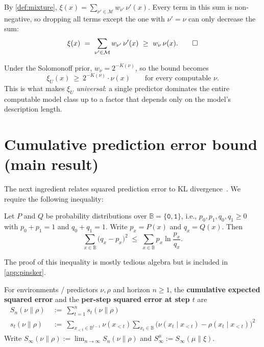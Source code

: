 \documentclass[fontsize=11pt, parskip=half]{scrartcl}
\newcommand{\Mc}{\mathcal{M}}
\newcommand{\Sn}[2]{S_{n}(#1 \parallel #2)}
\begin{document}
\begin{solution}
By \cref{def:mixture}, $\xi(x) = \sum_{\nu' \in \Mc} w_{\nu'} \,\nu'(x)$.
Every term in this sum is non-negative, so dropping all terms except the one with
$\nu' = \nu$ can only decrease the sum:
\[
  \xi(x) ~=~ \sum_{\nu' \in \Mc} w_{\nu'}\, \nu'(x)
  ~\geq~ w_\nu\, \nu(x). \qedhere
\]
\end{solution}

\begin{remark}
Under the Solomonoff prior, $w_\nu = 2^{-K(\nu)}$, so the bound becomes
\[
  \xi_U(x) ~\geq~ 2^{-K(\nu)} \cdot \nu(x) \qquad \text{for every computable }\nu.
\]
This is what makes $\xi_U$ \emph{universal}: a single predictor dominates the
entire computable model class up to a factor that depends only on the model's
description length.
\end{remark}

\section{Cumulative prediction error bound (main result)}\label{prob:bound}


The next ingredient relates squared prediction error to KL divergence~\cite[Lemma~11.6.1]{Cover:06}. 
We require the following inequality:

\begin{theorem}\label{thm:pinsker}
Let $P$ and $Q$ be probability distributions over $\mathbb{B} = \{\texttt{0}, \texttt{1}\}$, i.e., $p_0, p_1, q_0, q_1 \geq 0$
with $p_0 + p_1 = 1$ and $q_0 + q_1 = 1$. Write $p_x = P(x)$ and $q_x = Q(x)$. Then
\[
    \sum_{x \in \mathbb{B}} \big( q_x - p_x \big)^2 \;\leq\; \sum_{x \in \mathbb{B}} p_x \ln \frac{p_x}{q_x}.
    \tag{$\star$}
\]

\end{theorem}
The proof of this inequality is mostly tedious algebra but is included in \cref{app:pinsker}. 


\begin{definition}\label{def:S_infty}
For environments / predictors $\nu, \rho$ and horizon $n \geq 1$, the \textbf{cumulative expected squared error} and the \textbf{per-step squared error at step $t$} are
\begin{align*}
\Sn{\nu}{\rho} ~&:=~ \sum_{t=1}^n s_t(\nu \parallel \rho) \\
s_t(\nu \parallel \rho) ~&:=~ \sum_{x_{<t} \in \mathbb{B}^{t-1}} \nu(x_{<t}) \sum_{x_t \in \mathbb{B}} \bigl(\nu(x_t \mid x_{<t}) - \rho(x_t \mid x_{<t})\bigr)^2
\end{align*}
Write $S_{\infty}(\nu \parallel \rho) := \lim_{n \to \infty} \Sn{\nu}{\rho}$
and $S_\infty^\mu := S_{\infty}(\mu \parallel \xi)$.
\end{definition}
\end{document}
